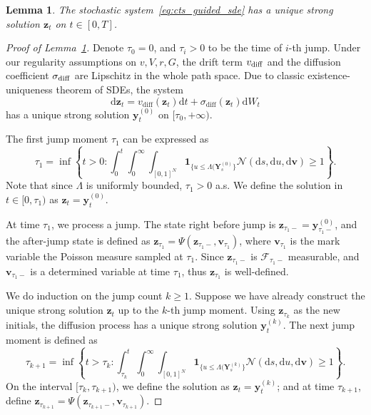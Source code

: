 \documentclass{article}
\newcommand{\mathbbm}[1]{\boldsymbol{#1}}
\theoremstyle{plain}
\newtheorem{lemma}[theorem]{Lemma}
\theoremstyle{definition}
\theoremstyle{remark}
\newcommand{\dif}{{\mathrm{d}}}
\begin{document}
   
\begin{lemma}
    The stochastic system~\eqref{eq:cts_guided_sde} has a unique strong solution \(\mathbbm{z}_t\) on \(t\in [0,T]\).
    \label{lem:unique_strong_solution}
\end{lemma}

\begin{proof}[Proof of Lemma~\ref{lem:unique_strong_solution}]
    Denote \(\tau_0=0\), and \(\tau_i>0\) to be the time of \(i\)-th jump. Under our regularity assumptions on \(v,V,r,G\), the drift term \(v_{\rm diff}\) and the diffusion coefficient \(\sigma_{\rm diff}\) are Lipschitz in the whole path space. Due to classic existence-uniqueness theorem of SDEs, the system \[\dif \mathbbm{z}_t = v_{\text{diff}}(\mathbbm{z}_t) \dif t + \sigma_{\text{diff}}(\mathbbm{z}_t) \dif W_t\] has a unique strong solution \(\mathbbm{y}_t^{(0)}\) on \([\tau_0,+\infty)\).
    
    The first jump moment \(\tau_1\) can be expressed as 
    \[
        \tau_1 = \inf \left\{ t > 0 : \int_0^t \int_0^\infty\int_{[0,1]^N} \mathbbm{1}_{\{u \le \Lambda(\mathbbm{Y}_{s}^{(0)}\}} \mathcal{N}(\dif s, \dif u, \dif \mathbbm{v}) \ge 1 \right\}.
    \] 
    Note that since \(\Lambda\) is uniformly bounded, \(\tau_1>0\) a.s. We define the solution in \(t\in [0,\tau_1)\) as \(\mathbbm{z}_t = \mathbbm{y}_t^{(0)}\).
    
    At time \(\tau_1\), we process a jump. The state right before jump is \(\mathbbm{z}_{\tau_1-}=\mathbbm{y}_{\tau_1-}^{(0)}\), and the after-jump state is defined as \(\mathbbm{z}_{\tau_1} = \Psi(\mathbbm{z}_{\tau_1-},\mathbbm{v}_{\tau_1})\), where \(\mathbbm{v}_{\tau_1}\) is the mark variable the Poisson measure sampled at \(\tau_1\). Since \(\mathbbm{z}_{\tau_1-}\) is \(\mathcal{F}_{\tau_1-}\) measurable, and \(\mathbbm{v}_{\tau_1-}\) is a determined variable at time \(\tau_1\), thus \(\mathbbm{z}_{\tau_1}\) is well-defined.
    
    We do induction on the jump count \(k\geq 1\). Suppose we have already construct the unique strong solution \(\mathbbm{z}_t\) up to the \(k\)-th jump moment. Using \(\mathbbm{z}_{\tau_k}\) as the new initials, the diffusion process has a unique strong solution \(\mathbbm{y}_t^{(k)}\). The next jump moment is defined as 
    \[
        \tau_{k+1} = \inf \left\{ t > \tau_k : \int_{\tau_k}^t \int_0^\infty\int_{[0,1]^N} \mathbbm{1}_{\{u \le \Lambda(\mathbbm{Y}_{s}^{(k)}\}} \mathcal{N}(\dif s, \dif u, \dif \mathbbm{v}) \ge 1 \right\}.
    \] 
    On the interval \([\tau_k,\tau_{k+1})\), we define the solution as \(\mathbbm{z}_t = \mathbbm{y}_t^{(k)}\); and at time \(\tau_{k+1}\), define \(\mathbbm{z}_{\tau_{k+1}}=\Psi(\mathbbm{z}_{\tau_{k+1}-},\mathbbm{v}_{\tau_{k+1}})\).
    

\end{proof}
\end{document}
